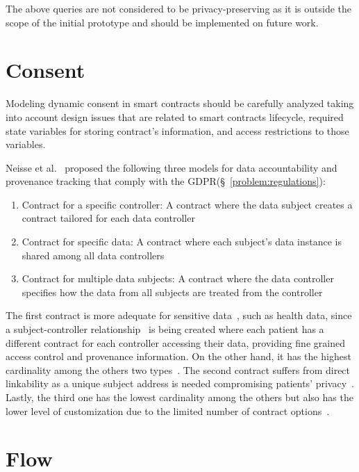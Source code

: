 The above queries are not considered to be privacy-preserving as it is outside the scope of the initial prototype and should be implemented on future work.

\section{Consent}
\label{solution:consent}

Modeling dynamic consent in smart contracts should be carefully analyzed taking into account design issues that are related to smart contracts lifecycle, required state variables for storing contract’s information, and access restrictions to those variables.

Neisse et al.~\cite{DBLP:journals/corr/NeisseSF17} proposed the following three models for data accountability and provenance tracking that comply with the GDPR(§~\ref{problem:regulations}):

\begin{enumerate}
  \item Contract for a specific controller: A contract where the data subject creates a contract tailored for each data controller
  \item Contract for specific data: A contract where each subject’s data instance is shared among all data controllers
  \item Contract for multiple data subjects: A contract where the data controller specifies how the data from all subjects are treated from the controller
\end{enumerate}

The first contract is more adequate for sensitive data~\cite{DBLP:journals/corr/NeisseSF17}, such as health data, since a subject-controller relationship~\cite{Azaria2016} is being created where each patient has a different contract for each controller accessing their data, providing fine grained access control and provenance information. On the other hand, it has the highest cardinality among the others two types~\cite{DBLP:journals/corr/NeisseSF17}. The second contract suffers from direct linkability as a unique subject address is needed compromising patients’ privacy~\cite{DBLP:journals/corr/NeisseSF17}. Lastly, the third one has the lowest cardinality among the others but also has the lower level of customization due to the limited number of contract options~\cite{DBLP:journals/corr/NeisseSF17}.

\section{Flow}
\label{solution:flow}

